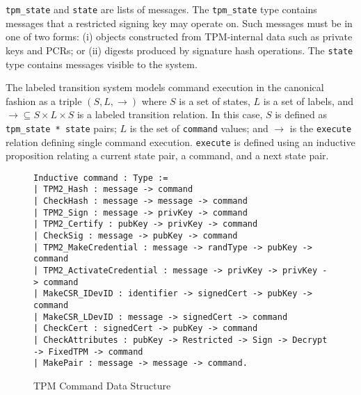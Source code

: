 \documentclass[runningheads]{llncs}
\begin{document}
\verb|tpm_state| and \verb|state| are lists of messages. The
\verb|tpm_state| type contains messages that a restricted signing key
may operate on. Such messages must be in one of two forms: (i) objects
constructed from TPM-internal data such as private keys and PCRs; or
(ii) digests produced by signature hash operations.  The \verb|state|
type contains messages visible to the system.

The labeled transition system models command execution in the
canonical fashion as a triple $(S,L,\rightarrow)$ where $S$ is a set
of states, $L$ is a set of labels, and
$\rightarrow \subseteq S \times L \times S$ is a labeled transition
relation.  In this case, $S$ is defined as \verb|tpm_state * state|
pairs; $L$ is the set of \verb|command| values; and $\rightarrow$ is
the \verb|execute| relation defining single command execution.
\verb|execute| is defined using an inductive proposition relating a
current state pair, a command, and a next state pair.



\begin{figure}[hbtp]
  \begin{footnotesize}
\begin{lstlisting}[language=Coq]
Inductive command : Type :=
| TPM2_Hash : message -> command
| CheckHash : message -> message -> command
| TPM2_Sign : message -> privKey -> command
| TPM2_Certify : pubKey -> privKey -> command
| CheckSig : message -> pubKey -> command
| TPM2_MakeCredential : message -> randType -> pubKey -> command
| TPM2_ActivateCredential : message -> privKey -> privKey -> command
| MakeCSR_IDevID : identifier -> signedCert -> pubKey -> command
| MakeCSR_LDevID : message -> signedCert -> command
| CheckCert : signedCert -> pubKey -> command
| CheckAttributes : pubKey -> Restricted -> Sign -> Decrypt -> FixedTPM -> command
| MakePair : message -> message -> command.
\end{lstlisting}
\end{footnotesize}
\caption{TPM Command Data Structure}
\label{fig:command-model}
\end{figure}
\end{document}
